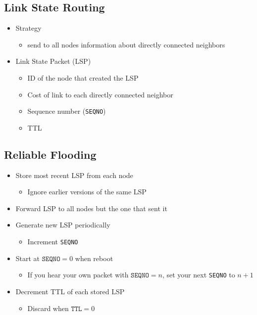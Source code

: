 \subsection{Link State Routing}
\begin{itemize}[nosep]
    \item Strategy
          \begin{itemize}[nosep]
              \item send to all nodes information about directly connected neighbors
          \end{itemize}
    \item Link State Packet (LSP)
          \begin{itemize}[nosep]
              \item ID of the node that created the LSP
              \item Cost of link to each directly connected neighbor
              \item Sequence number (\texttt{SEQNO})
              \item TTL
          \end{itemize}
\end{itemize}

\subsection{Reliable Flooding}
\begin{itemize}[nosep]
    \item Store most recent LSP from each node
          \begin{itemize}[nosep]
              \item Ignore earlier versions of the same LSP
          \end{itemize}
    \item Forward LSP to all nodes but the one that sent it
    \item Generate new LSP periodically
          \begin{itemize}[nosep]
              \item Increment \texttt{SEQNO}
          \end{itemize}
    \item Start at $\texttt{SEQNO}=0$ when reboot
          \begin{itemize}[nosep]
              \item If you hear your own packet with $\texttt{SEQNO} = n$, set your next \texttt{SEQNO} to $n + 1$
          \end{itemize}
    \item Decrement TTL of each stored LSP
          \begin{itemize}[nosep]
              \item Discard when $\texttt{TTL} = 0$
          \end{itemize}
\end{itemize}
